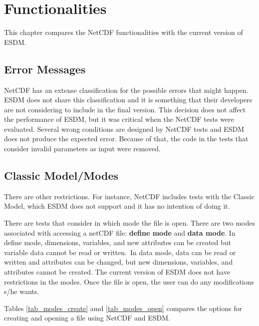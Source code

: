 \chapter{Functionalities}

\tab
This chapter compares the NetCDF functionalities with the current version of ESDM.

\section{Error Messages}

\tab
NetCDF has an extense classification for the possible errors that might happen. ESDM does not share this classification and it is something that their developers are not considering to include in the final version. This decision does not affect the performance of ESDM, but it was critical when the NetCDF tests were evaluated. Several wrong conditions are designed by NetCDF tests and ESDM does not produce the expected error. Because of that, the code in the tests that consider invalid parameters as input were removed.

\section{Classic Model/Modes}

\tab
There are other restrictions. For instance, NetCDF includes tests with the Classic Model, which ESDM does not support and it has no intention of doing it.

There are tests that consider in which mode the file is open. There are two modes associated with accessing a netCDF file: {\bf define mode} and {\bf data mode}. In define mode, dimensions, variables, and new attributes can be created but variable data cannot be read or written. In data mode, data can be read or written and attributes can be changed, but new dimensions, variables, and attributes cannot be created. The current version of ESDM does not have restrictions in the modes. Once the file is open, the user can do any modifications s/he wants.

Tables \ref{tab_modes_create} amd \ref{tab_modes_open} compares the options for creating and opening a file using NetCDF and ESDM.

